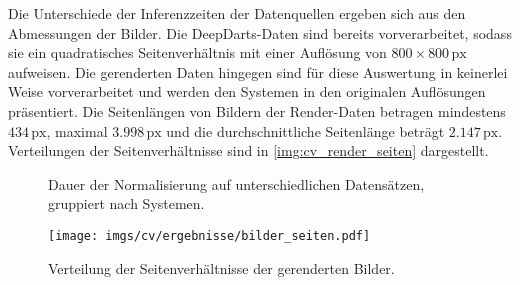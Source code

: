 Die Unterschiede der Inferenzzeiten der Datenquellen ergeben sich aus den Abmessungen der Bilder. Die DeepDarts-Daten sind bereits vorverarbeitet, sodass sie ein quadratisches Seitenverhältnis mit einer Auflösung von $800 \times 800\,\text{px}$ aufweisen. Die gerenderten Daten hingegen sind für diese Auswertung in keinerlei Weise vorverarbeitet und werden den Systemen in den originalen Auflösungen präsentiert. Die Seitenlängen von Bildern der Render-Daten betragen mindestens $434\,\text{px}$, maximal $3.998\,\text{px}$ und die durchschnittliche Seitenlänge beträgt $2.147\,\text{px}$. Verteilungen der Seitenverhältnisse sind in \autoref{img:cv_render_seiten} dargestellt.

\begin{figure}
    \centering
    \caption{Dauer der Normalisierung auf unterschiedlichen Datensätzen, gruppiert nach Systemen.}
    \label{fig:cv_dauer}
\end{figure}

\begin{figure}
    \centering
    \texttt{[image: imgs/cv/ergebnisse/bilder\_seiten.pdf]}
    \caption{Verteilung der Seitenverhältnisse der gerenderten Bilder.}
    \label{img:cv_render_seiten}
\end{figure}

